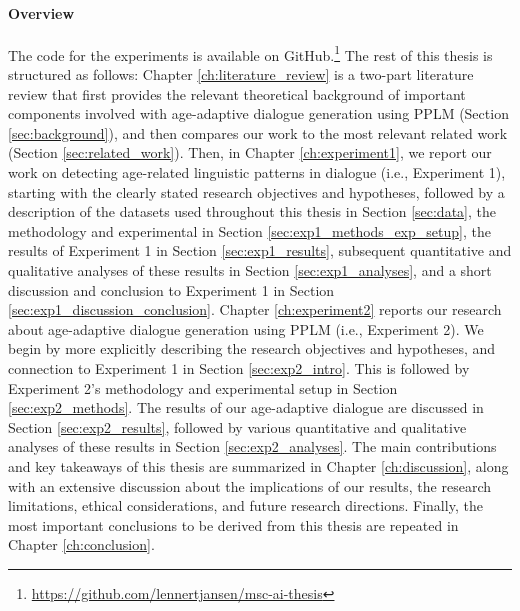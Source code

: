 \paragraph{Overview}
The code for the experiments is available on GitHub.\footnote{\url{https://github.com/lennertjansen/msc-ai-thesis}}
The rest of this thesis is structured as follows: Chapter \ref{ch:literature_review} is a two-part literature review that first provides the relevant theoretical background of important components involved with age-adaptive dialogue generation using PPLM (Section \ref{sec:background}), and then compares our work to the most relevant related work (Section \ref{sec:related_work}).
Then, in Chapter \ref{ch:experiment1}, we report our work on detecting age-related linguistic patterns in dialogue (i.e., Experiment 1), starting with the clearly stated research objectives and hypotheses, followed by a description of the datasets used throughout this thesis in Section \ref{sec:data}, the methodology and experimental in Section \ref{sec:exp1_methods_exp_setup}, the results of Experiment 1 in Section \ref{sec:exp1_results}, subsequent quantitative and qualitative analyses of these results in Section \ref{sec:exp1_analyses}, and a short discussion and conclusion to Experiment 1 in Section \ref{sec:exp1_discussion_conclusion}.
Chapter \ref{ch:experiment2} reports our research about age-adaptive dialogue generation using PPLM (i.e., Experiment 2). We begin by more explicitly describing the research objectives and hypotheses, and connection to Experiment 1 in Section \ref{sec:exp2_intro}. This is followed by Experiment 2's methodology and experimental setup in Section \ref{sec:exp2_methods}. The results of our age-adaptive dialogue are discussed in Section \ref{sec:exp2_results}, followed by various quantitative and qualitative analyses of these results in Section \ref{sec:exp2_analyses}.
The main contributions and key takeaways of this thesis are summarized in Chapter \ref{ch:discussion}, along with an extensive discussion about the implications of our results, the research limitations, ethical considerations, and future research directions.
Finally, the most important conclusions to be derived from this thesis are repeated in Chapter \ref{ch:conclusion}.


